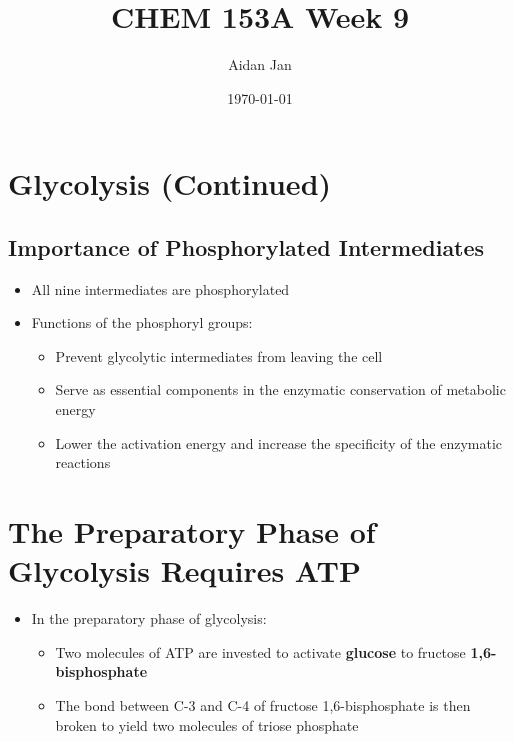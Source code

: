 \documentclass[10pt]{article}
\title{CHEM 153A Week 9}
\author{Aidan Jan}
\date{\today}
\begin{document}
\maketitle
\section*{Glycolysis (Continued)}
\subsection*{Importance of Phosphorylated Intermediates}
\begin{itemize}
	\item All nine intermediates are phosphorylated
	\item Functions of the phosphoryl groups:
	\begin{itemize}
        \item Prevent glycolytic intermediates from leaving the cell
        \item Serve as essential components in the enzymatic conservation of metabolic energy
        \item Lower the activation energy and increase the specificity of the enzymatic reactions
    \end{itemize}
\end{itemize}

\section*{The Preparatory Phase of Glycolysis Requires ATP}
\begin{itemize}
	\item In the preparatory phase of glycolysis:
	\begin{itemize}
        \item Two molecules of ATP are invested to activate \textbf{glucose} to fructose \textbf{1,6-bisphosphate}
        \item The bond between C-3 and C-4 of fructose 1,6-bisphosphate is then broken to yield two molecules of triose phosphate
    \end{itemize}
\end{itemize}
\end{document}
